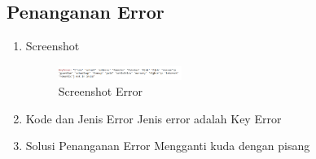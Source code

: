     \subsection{Penanganan Error}
        \begin{enumerate}
            \item Screenshot
            \begin{figure}[H]
                \includegraphics[width=4cm]{figures/1174040/chapter2/error.png}
                \centering
                \caption{Screenshot Error}
            \end{figure}
            \item Kode dan Jenis Error
            Jenis error adalah Key Error
            \hfill \break 
            \item Solusi Penanganan Error
            Mengganti kuda dengan pisang
        \end{enumerate}